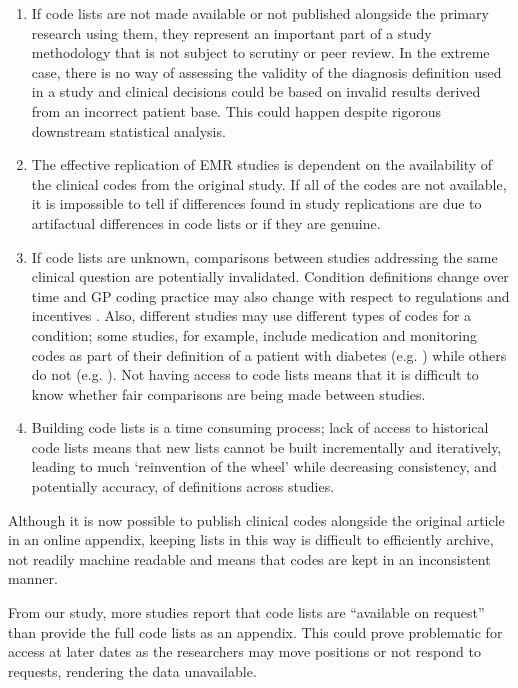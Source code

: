 \documentclass[10pt]{article}
\begin{document}
\begin{enumerate}
    \item If code lists are not made available or not published alongside the primary research using them, they represent an important part of a study methodology that is not subject to scrutiny or peer review. In the extreme case, there is no way of assessing the validity of the diagnosis definition used in a study and clinical decisions could be based on invalid results derived from an incorrect patient base.  This could happen despite rigorous downstream statistical analysis.  
    \item The effective replication of EMR studies is dependent on the availability of the clinical codes from the original study.  If all of the codes are not available, it is impossible to tell if differences found in study replications are due to artifactual differences in code lists or if they are genuine.  
    \item If code lists are unknown, comparisons between studies addressing the same clinical question are potentially invalidated.  Condition definitions change over time and GP coding practice may also change with respect to regulations and incentives \cite{Hippisley-Cox2006}. Also, different studies may use different types of codes for a condition; some studies, for example, include medication and monitoring codes as part of their definition of a patient with diabetes (e.g. \cite{Mulnier2006}) while others do not (e.g. \cite{Kontopantelis2014}).  Not having access to code lists means that it is difficult to know whether fair comparisons are being made between studies. 
    \item Building code lists is a time consuming process; lack of access to historical code lists  means that new lists cannot be built incrementally and iteratively, leading to much `reinvention of the wheel' while decreasing consistency, and potentially accuracy, of definitions across studies.
\end{enumerate}

Although it is now possible to publish clinical codes alongside the original article in an online appendix, keeping lists in this way is difficult to efficiently archive, not readily machine readable and means that codes are kept in an inconsistent manner.

From our study, more studies report that code lists are ``available on request'' than provide the full code lists as an appendix.  This could prove problematic for access at later dates as the researchers may move positions or not respond to requests, rendering the data unavailable.
\end{document}
